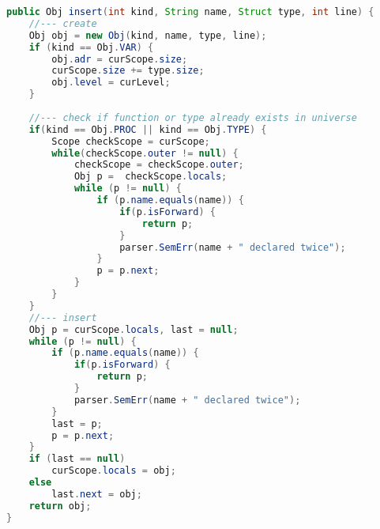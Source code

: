 \begin{lstlisting}[language=Java]
public Obj insert(int kind, String name, Struct type, int line) {
	//--- create
	Obj obj = new Obj(kind, name, type, line);
	if (kind == Obj.VAR) {
		obj.adr = curScope.size;
		curScope.size += type.size;
		obj.level = curLevel;
	}
	
	//--- check if function or type already exists in universe
	if(kind == Obj.PROC || kind == Obj.TYPE) {
		Scope checkScope = curScope;
		while(checkScope.outer != null) {
			checkScope = checkScope.outer;
			Obj p =  checkScope.locals;
			while (p != null) {
				if (p.name.equals(name)) {
					if(p.isForward) {
						return p;
					}
					parser.SemErr(name + " declared twice");
				}
				p = p.next;
			}
		}
	}
	//--- insert
	Obj p = curScope.locals, last = null;
	while (p != null) {
		if (p.name.equals(name)) {
			if(p.isForward) {
				return p;
			}
			parser.SemErr(name + " declared twice");
		}
		last = p;
		p = p.next;
	}
	if (last == null)
		curScope.locals = obj;
	else
		last.next = obj;
	return obj;
}
\end{lstlisting}



